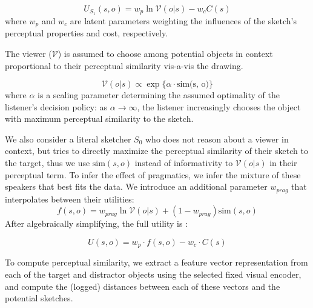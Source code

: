 \documentclass[9pt,twocolumn,twoside]{pnas-new}
\begin{document}
{\begin{equation} \label{sketcher_utility}
U_{S_1}(s, o) = w_p \ln \mathcal{V}(o|s) - w_c C(s)
\end{equation}
where $w_p$ and $w_c$ are latent parameters weighting the influences of the sketch's perceptual properties and cost, respectively. 

The viewer ($\mathcal{V}$) is assumed to choose among potential objects in context proportional to their perceptual similarity vis-a-vis the drawing.

\begin{equation} \label{literal_viewer_score}
\mathcal{V}(o|s) \propto \exp\{\alpha \cdot \textrm{sim(s, o)}\}
\end{equation}
where $\alpha$ is a scaling parameter determining the assumed optimality of the listener's decision policy: as $\alpha \rightarrow \infty$, the listener increasingly chooses the object with maximum perceptual similarity to the sketch. 

We also consider a literal sketcher $S_0$ who does not reason about a viewer in context, but tries to directly maximize the perceptual similarity of their sketch to the target, thus we use $\textrm{sim}(s, o)$ instead of informativity to $\mathcal{V}(o|s)$ in their perceptual term. To infer the effect of pragmatics, we infer the mixture of these speakers that best fits the data. We introduce an additional parameter $w_{prag}$ that interpolates between their utilities: $$f(s,o) = w_{prag}\ln \mathcal{V}(o | s) + (1-w_{prag}) \textrm{sim}(s,o)$$ After algebraically simplifying, the full utility is :

\begin{equation}
U(s,o) =  w_p \cdot  f(s,o) - w_c \cdot C(s)
\end{equation}

To compute perceptual similarity, we extract a feature vector representation from each of the target and distractor objects using the selected fixed visual encoder, and compute the (logged) distances between each of these vectors and the potential sketches.
}

\showmatmethods %


\showacknow{} %



\end{document}
